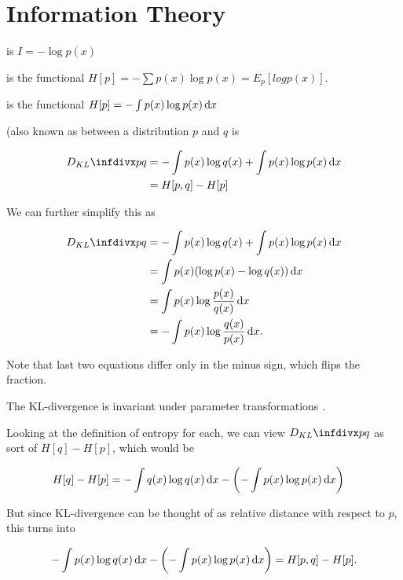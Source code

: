 \section{Information Theory}

\begin{defn}
     is $I = -\log p(x)$
\end{defn}

\begin{defn}
     is the functional $H[p] = - \sum p(x) \log p(x) = E_p[log p(x)]$.
\end{defn}

\begin{defn}
     is the functional $H[p] = - \int p(x) \log p(x) \mathop{}\!\mathrm{d} x$
\end{defn}

\begin{defn}
     (also known as  between a distribution $p$ and $q$ is
    
    \begin{align}
        \kldiv{p}{q} &= -\int p(x) \log q(x) + \int p(x) \log p(x) \dx  \\
        &= H[p, q] - H[p]
    \end{align}
\end{defn}

We can further simplify this as

\begin{align}
    \kldiv{p}{q} &= -\int p(x) \log q(x) + \int p(x) \log p(x) \dx  \\
    &= \int p(x) (\log p(x) - \log q(x)) \dx \\
    &= \int p(x) \log \frac{p(x)}{q(x)} \dx \\
    &= - \int p(x) \log \frac{q(x)}{p(x)} \dx.
\end{align}

Note that last two equations differ only in the minus sign, which flips the fraction.

\begin{thm}
The KL-divergence is invariant under parameter transformations .
\end{thm}

\begin{tcolorbox}
    Looking at the definition of entropy for each, we can view $\kldiv{p}{q}$ as sort of $H[q] - H[p]$, which would be
    
    \begin{align}
        H[q] - H[p] &= -\int q(x) \log q(x) \mathop{}\!\mathrm{d} x - \left( -\int p(x) \log p(x) \mathop{}\!\mathrm{d} x \right)
    \end{align}
    
    But since KL-divergence can be thought of as relative distance with respect to $p$, this turns into
    
    \begin{align}
        -\int p(x) \log q(x) \mathop{}\!\mathrm{d} x - \left( -\int p(x) \log p(x) \mathop{}\!\mathrm{d} x \right) = H[p, q] - H[p].
    \end{align}
\end{tcolorbox}

